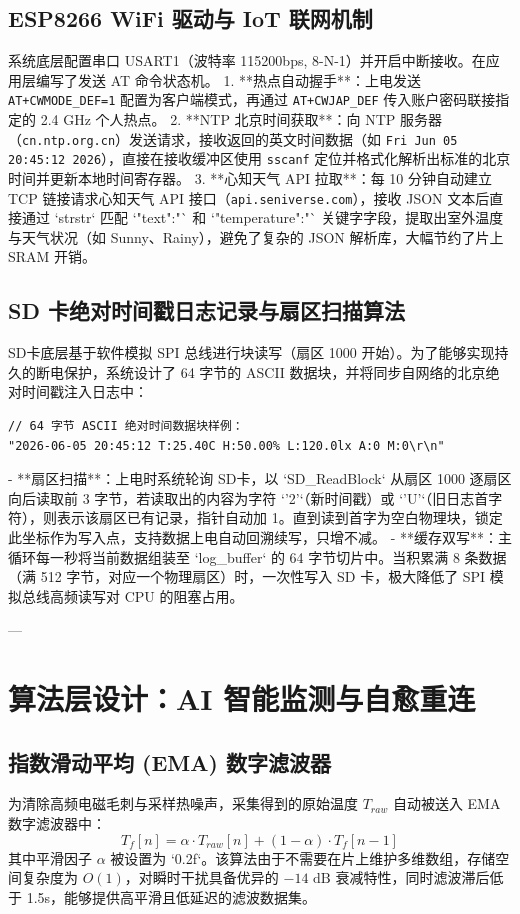 \documentclass[11pt,a4paper]{ctexart}
\begin{document}
\subsection{ESP8266 WiFi 驱动与 IoT 联网机制}
系统底层配置串口 USART1（波特率 115200bps, 8-N-1）并开启中断接收。在应用层编写了发送 AT 命令状态机。
1. **热点自动握手**：上电发送 \texttt{AT+CWMODE\_DEF=1} 配置为客户端模式，再通过 \texttt{AT+CWJAP\_DEF} 传入账户密码联接指定的 2.4 GHz 个人热点。
2. **NTP 北京时间获取**：向 NTP 服务器（\texttt{cn.ntp.org.cn}）发送请求，接收返回的英文时间数据（如 \texttt{Fri Jun 05 20:45:12 2026}），直接在接收缓冲区使用 \texttt{sscanf} 定位并格式化解析出标准的北京时间并更新本地时间寄存器。
3. **心知天气 API 拉取**：每 10 分钟自动建立 TCP 链接请求心知天气 API 接口（\texttt{api.seniverse.com}），接收 JSON 文本后直接通过 `strstr` 匹配 `"text":"` 和 `"temperature":"` 关键字字段，提取出室外温度与天气状况（如 Sunny、Rainy），避免了复杂的 JSON 解析库，大幅节约了片上 SRAM 开销。

\subsection{SD 卡绝对时间戳日志记录与扇区扫描算法}
SD卡底层基于软件模拟 SPI 总线进行块读写（扇区 1000 开始）。为了能够实现持久的断电保护，系统设计了 64 字节的 ASCII 数据块，并将同步自网络的北京绝对时间戳注入日志中：
\begin{lstlisting}[style=cstyle]
// 64 字节 ASCII 绝对时间数据块样例：
"2026-06-05 20:45:12 T:25.40C H:50.00% L:120.0lx A:0 M:0\r\n"
\end{lstlisting}
- **扇区扫描**：上电时系统轮询 SD卡，以 `SD\_ReadBlock` 从扇区 1000 逐扇区向后读取前 3 字节，若读取出的内容为字符 `'2'`（新时间戳）或 `'U'`（旧日志首字符），则表示该扇区已有记录，指针自动加 1。直到读到首字为空白物理块，锁定此坐标作为写入点，支持数据上电自动回溯续写，只增不减。
- **缓存双写**：主循环每一秒将当前数据组装至 `log\_buffer` 的 64 字节切片中。当积累满 8 条数据（满 512 字节，对应一个物理扇区）时，一次性写入 SD 卡，极大降低了 SPI 模拟总线高频读写对 CPU 的阻塞占用。

---

\section{算法层设计：AI 智能监测与自愈重连}

\subsection{指数滑动平均 (EMA) 数字滤波器}
为清除高频电磁毛刺与采样热噪声，采集得到的原始温度 $T_{raw}$ 自动被送入 EMA 数字滤波器中：
$$T_f[n] = \alpha \cdot T_{raw}[n] + (1 - \alpha) \cdot T_f[n-1]$$
其中平滑因子 $\alpha$ 被设置为 `0.2f`。该算法由于不需要在片上维护多维数组，存储空间复杂度为 $O(1)$，对瞬时干扰具备优异的 $-14\text{ dB}$ 衰减特性，同时滤波滞后低于 1.5s，能够提供高平滑且低延迟的滤波数据集。
\end{document}
